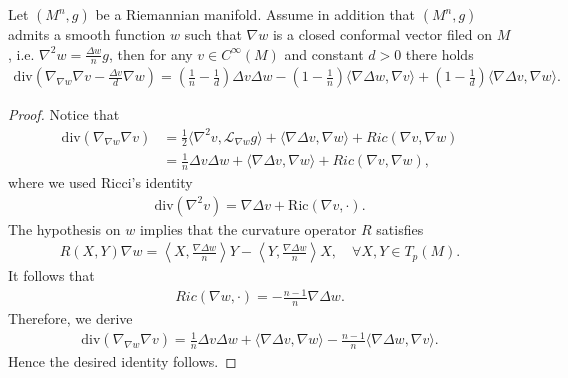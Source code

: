 \documentclass[10pt,a4paper]{amsart}
\begin{document}
\begin{lemma}\label{cor. div 1w}
    Let $(M^n,g)$ be a Riemannian manifold. Assume in addition that $(M^n,g)$ admits a smooth function $w$ such that $\nabla w$ is a closed conformal vector filed on $M$, i.e. $\nabla ^2 w=\frac{\Delta w}{n}g$, then for any $v\in C^{\infty}(M)$ and constant $d>0$ there holds
    \begin{align}\label{eq. div 1w}
        \mathrm{div}\left(\nabla_{\nabla w}\nabla v-\frac{\Delta v}{d}\nabla w\right)
        =\left(\frac{1}{n}-\frac{1}{d}\right)\Delta v\Delta w
        -\left(1-\frac{1}{n}\right)\langle\nabla \Delta w,\nabla v\rangle
        +\left(1-\frac{1}{d}\right)\langle\nabla \Delta v,\nabla w\rangle.
    \end{align}
\end{lemma}

\begin{proof}
    Notice that
    \begin{align*}
        \mathrm{div}(\nabla_{\nabla w}\nabla v)
        &=\frac{1}{2}\langle \nabla^2 v,\mathcal{L}_{\nabla w}g\rangle
        +\langle\nabla\Delta v,\nabla w\rangle
        +Ric(\nabla v,\nabla w)\\
        &=\frac{1}{n}\Delta v\Delta w
        +\langle\nabla\Delta v,\nabla w\rangle
        +Ric(\nabla v,\nabla w),
    \end{align*}
    where we used Ricci's identity
    \begin{align*}
        \mathrm{div}(\nabla^2 v)=\nabla \Delta v+\mathrm{Ric}(\nabla v,\cdot).
    \end{align*}
    The hypothesis on $w$ implies that the curvature operator $R$ satisfies
    \begin{align*}
        R(X,Y)\nabla w=\left\langle X, \frac{\nabla \Delta w}{n}\right\rangle Y
        -\left\langle Y, \frac{\nabla \Delta w}{n}\right\rangle X,\quad \forall X,Y\in T_p(M).
    \end{align*}
    It follows that 
    \begin{align*}
        Ric(\nabla w,\cdot)=-\frac{n-1}{n}\nabla \Delta w.
    \end{align*}
    Therefore, we derive
    \begin{align*}
        \mathrm{div}(\nabla_{\nabla w}\nabla v)
        =\frac{1}{n}\Delta v\Delta w
        +\langle\nabla\Delta v,\nabla w\rangle
        -\frac{n-1}{n}\langle\nabla \Delta w,\nabla v\rangle.
    \end{align*}
    Hence the desired identity follows.
\end{proof}
\end{document}

